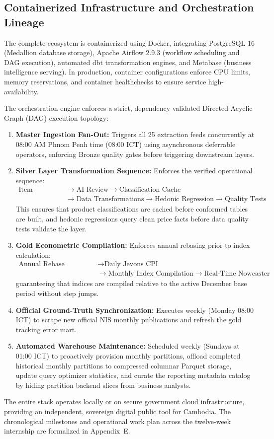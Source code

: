 \subsection{Containerized Infrastructure and Orchestration Lineage}
\hs The complete ecosystem is containerized using Docker, integrating PostgreSQL 16 (Medallion database storage), Apache Airflow 2.9.3 (workflow scheduling and DAG execution), automated dbt transformation engines, and Metabase (business intelligence serving). In production, container configurations enforce CPU limits, memory reservations, and container healthchecks to ensure service high-availability.

\hs The orchestration engine enforces a strict, dependency-validated Directed Acyclic Graph (DAG) execution topology:
\begin{enumerate}
    \item \textbf{Master Ingestion Fan-Out:} Triggers all 25 extraction feeds concurrently at 08:00 AM Phnom Penh time (08:00 ICT) using asynchronous deferrable operators, enforcing Bronze quality gates before triggering downstream layers.
    \item \textbf{Silver Layer Transformation Sequence:} Enforces the verified operational sequence:
    \begin{equation*}
    \begin{split}
        \text{Item Matching} &\longrightarrow \text{AI Review} \longrightarrow \text{Classification Cache} \\
        &\longrightarrow \text{Data Transformations} \longrightarrow \text{Hedonic Regression} \longrightarrow \text{Quality Tests}
    \end{split}
    \end{equation*}
    This ensures that product classifications are cached before conformed tables are built, and hedonic regressions query clean price facts before data quality tests validate the layer.
    \item \textbf{Gold Econometric Compilation:} Enforces annual rebasing prior to index calculation:
    \begin{equation*}
    \begin{split}
        \text{Annual Rebase Verification} &\longrightarrow \text{Daily Jevons CPI} \\
        &\longrightarrow \text{Monthly Index Compilation} \longrightarrow \text{Real-Time Nowcaster}
    \end{split}
    \end{equation*}
    guaranteeing that indices are compiled relative to the active December base period without step jumps.
    \item \textbf{Official Ground-Truth Synchronization:} Executes weekly (Monday 08:00 ICT) to scrape new official NIS monthly publications and refresh the gold tracking error mart.
    \item \textbf{Automated Warehouse Maintenance:} Scheduled weekly (Sundays at 01:00 ICT) to proactively provision monthly partitions, offload completed historical monthly partitions to compressed columnar Parquet storage, update query optimizer statistics, and curate the reporting metadata catalog by hiding partition backend slices from business analysts.
\end{enumerate}
The entire stack operates locally or on secure government cloud infrastructure, providing an independent, sovereign digital public tool for Cambodia. The chronological milestones and operational work plan across the twelve-week internship are formalized in Appendix~E.

